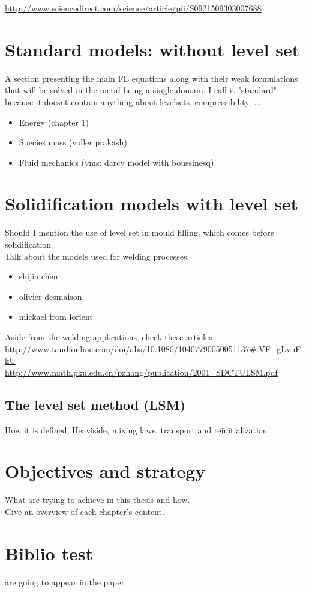\url{http://www.sciencedirect.com/science/article/pii/S0921509303007688}


\section{Standard models: without level set}
A section presenting the main FE equations along with their weak formulations that will be solved 
in the metal being a single domain. I call it "standard" because it doesnt contain anything about 
levelsets, compressibility, ...
\begin{itemize}
\item Energy (chapter 1)
\item Species mass (voller prakash) 
\item Fluid mechanics (vms: darcy model with boussinesq)
\end{itemize}

\section{Solidification models with level set}
Should I mention the use of level set in mould filling, which comes before solidification \\
Talk about the models used for welding processes. 
\begin{itemize}
\item shijia chen
\item olivier desmaison
\item mickael from lorient 
\end{itemize}
Aside from the welding applications, check these articles
\url{http://www.tandfonline.com/doi/abs/10.1080/10407790050051137#.VF_gLvnF_kU} \\
\url{http://www.math.pku.edu.cn/pzhang/publication/2001_SDCTULSM.pdf}


\subsection{The level set method (LSM)}
How it is defined, Heaviside, mixing laws, transport and reinitialization

\section{Objectives and strategy}
What are trying to achieve in this thesis and how. \\
Give an overview of each chapter's content.


\section{Biblio test}
\cite{carozzani_direct_2013} are going to appear in the paper 